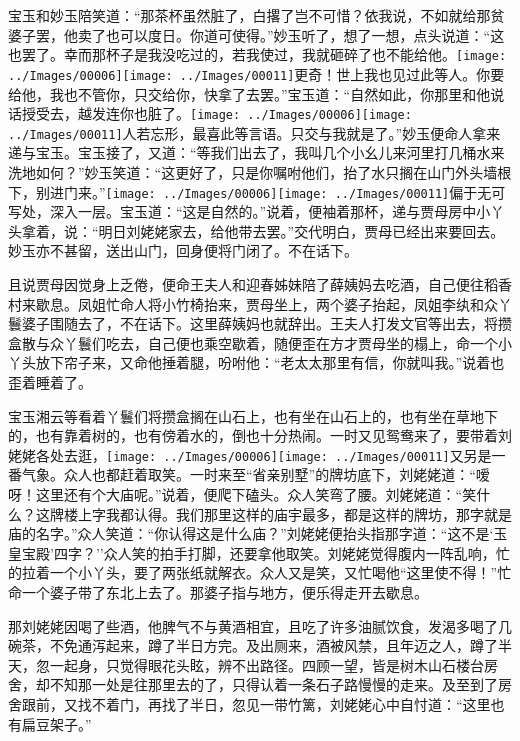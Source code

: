 宝玉和妙玉陪笑道：``那茶杯虽然脏了，白撂了岂不可惜？依我说，不如就给那贫婆子罢，他卖了也可以度日。你道可使得。''妙玉听了，想了一想，点头说道：``这也罢了。幸而那杯子是我没吃过的，若我使过，我就砸碎了也不能给他。{\texttt{[image: ../Images/00006]}\texttt{[image: ../Images/00011]}\footnotesize \kaishu 更奇！世上我也见过此等人。}你要给他，我也不管你，只交给你，快拿了去罢。''宝玉道：``自然如此，你那里和他说话授受去，越发连你也脏了。{\texttt{[image: ../Images/00006]}\texttt{[image: ../Images/00011]}\footnotesize \kaishu 人若忘形，最喜此等言语。}只交与我就是了。''妙玉便命人拿来递与宝玉。宝玉接了，又道：``等我们出去了，我叫几个小幺儿来河里打几桶水来洗地如何？''妙玉笑道：``这更好了，只是你嘱咐他们，抬了水只搁在山门外头墙根下，别进门来。''{\texttt{[image: ../Images/00006]}\texttt{[image: ../Images/00011]}\footnotesize \kaishu 偏于无可写处，深入一层。}宝玉道：``这是自然的。''说着，便袖着那杯，递与贾母房中小丫头拿着，说：``明日刘姥姥家去，给他带去罢。''交代明白，贾母已经出来要回去。妙玉亦不甚留，送出山门，回身便将门闭了。不在话下。

且说贾母因觉身上乏倦，便命王夫人和迎春姊妹陪了薛姨妈去吃酒，自己便往稻香村来歇息。凤姐忙命人将小竹椅抬来，贾母坐上，两个婆子抬起，凤姐李纨和众丫鬟婆子围随去了，不在话下。这里薛姨妈也就辞出。王夫人打发文官等出去，将攒盒散与众丫鬟们吃去，自己便也乘空歇着，随便歪在方才贾母坐的榻上，命一个小丫头放下帘子来，又命他捶着腿，吩咐他：``老太太那里有信，你就叫我。''说着也歪着睡着了。

宝玉湘云等看着丫鬟们将攒盒搁在山石上，也有坐在山石上的，也有坐在草地下的，也有靠着树的，也有傍着水的，倒也十分热闹。一时又见鸳鸯来了，要带着刘姥姥各处去逛，{\texttt{[image: ../Images/00006]}\texttt{[image: ../Images/00011]}\footnotesize \kaishu 又另是一番气象。}众人也都赶着取笑。一时来至``省亲别墅''的牌坊底下，刘姥姥道：``嗳呀！这里还有个大庙呢。''说着，便爬下磕头。众人笑弯了腰。刘姥姥道：``笑什么？这牌楼上字我都认得。我们那里这样的庙宇最多，都是这样的牌坊，那字就是庙的名字。''众人笑道：``你认得这是什么庙？''刘姥姥便抬头指那字道：``这不是`玉皇宝殿'四字？''众人笑的拍手打脚，还要拿他取笑。刘姥姥觉得腹内一阵乱响，忙的拉着一个小丫头，要了两张纸就解衣。众人又是笑，又忙喝他``这里使不得！''忙命一个婆子带了东北上去了。那婆子指与地方，便乐得走开去歇息。

那刘姥姥因喝了些酒，他脾气不与黄酒相宜，且吃了许多油腻饮食，发渴多喝了几碗茶，不免通泻起来，蹲了半日方完。及出厕来，酒被风禁，且年迈之人，蹲了半天，忽一起身，只觉得眼花头眩，辨不出路径。四顾一望，皆是树木山石楼台房舍，却不知那一处是往那里去的了，只得认着一条石子路慢慢的走来。及至到了房舍跟前，又找不着门，再找了半日，忽见一带竹篱，刘姥姥心中自忖道：``这里也有扁豆架子。''

